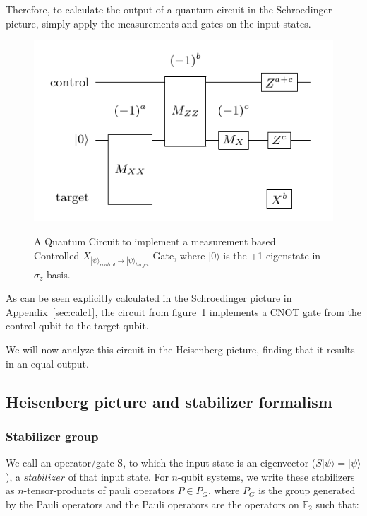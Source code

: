 Therefore, to calculate the output of a quantum circuit in the Schroedinger
picture, simply apply the measurements and gates on the input states.
\begin{figure}[h!]
	\begin{center}
	\captionsetup{justification=centering,margin=2cm}
	\includegraphics[scale=0.4]{img/figures/cnotMeasureCircuit.png}\\
	\caption{A Quantum Circuit to implement a measurement based\\
		Controlled-$X_{|\psi\rangle_{control}\rightarrow |\psi\rangle_{target}}$ Gate,
		where $|0\rangle$ is the +1 eigenstate in $\sigma_{z}$-basis.}
	\label{fig:circuit1}
	\end{center}
\end{figure}
As can be seen explicitly calculated in the Schroedinger 
picture in Appendix~\ref{sec:calc1}, the circuit from figure~\ref{fig:circuit1}
implements a CNOT gate from the control qubit to the target qubit.

We will now analyze this circuit in the Heisenberg picture\cite{gottesman},
finding that it results in an equal output.

\subsection{Heisenberg picture and stabilizer formalism}
\subsubsection{Stabilizer group}
We call an operator/gate S, to which the input state is an
eigenvector ($S|\psi\rangle=|\psi\rangle$), a $stabilizer$ of that input state. 
For $n$-qubit systems, we write these stabilizers as $n$-tensor-products 
of pauli operators $P \in P_{G}$,
where $P_{G}$ is the group generated by the Pauli operators and
the Pauli operators are the operators on $\mathbb{F}_{2}$ such that:

